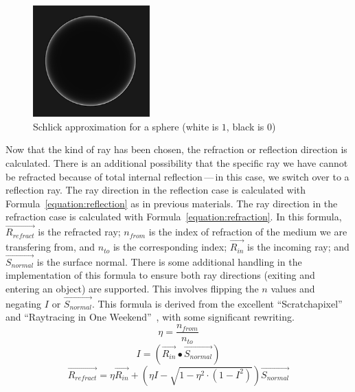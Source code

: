 \vspace{0.3em}
\begin{figure}[htb]
  \centering
  \includegraphics[width=0.4\textwidth]{resources/fresnel}
  \caption{Schlick approximation for a sphere (white is $1$, black is $0$)~\cite{learnopengltheory}}
\label{fig:rayterm-cpu_fresnel}
\end{figure}

Now that the kind of ray has been chosen, the refraction or reflection direction is calculated.
There is an additional possibility that the specific ray we have cannot be refracted because of total internal reflection\,---\,in this case, we switch over to a reflection ray.
The ray direction in the reflection case is calculated with Formula~\ref{equation:reflection} as in previous materials.
The ray direction in the refraction case is calculated with Formula~\ref{equation:refraction}.
In this formula, $\vec{R_{refract}}$ is the refracted ray; $n_{from}$ is the index of refraction of the medium we are transfering from, and $n_{to}$ is the corresponding index; $\vec{R_{in}}$ is the incoming ray; and $\vec{S_{normal}}$ is the surface normal.
There is some additional handling in the implementation of this formula to ensure both ray directions (exiting and entering an object) are supported.
This involves flipping the $n$ values and negating $I$ or $\vec{S_{normal}}$.
This formula is derived from the excellent ``Scratchapixel''~\cite{prunier2017shading} and ``Raytracing in One Weekend''~\cite{shirley2016ray}, with some significant rewriting.
\begin{equation}
\label{equation:refraction_eta}
  \eta = \frac{n_{from}}{n_{to}}
\end{equation}
\begin{equation}
\label{equation:refraction_i}
  I = (\vec{R_{in}} \bullet \vec{S_{normal}})
\end{equation}
\begin{equation}
\label{equation:refraction}
  \vec{R_{refract}} = \eta\vec{R_{in}} + (\eta I - \sqrt{1 - \eta^2 \cdot (1 - I^2)})\vec{S_{normal}}
\end{equation}

